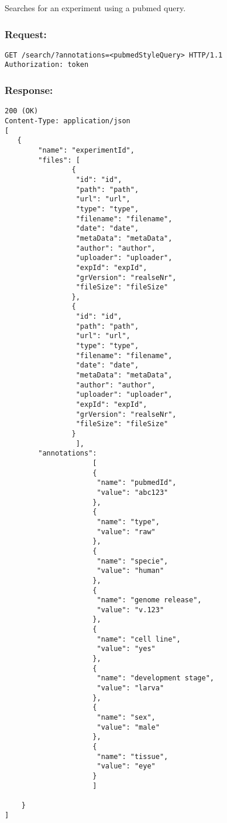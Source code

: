 Searches for an experiment using a pubmed query.

\subsubsection*{Request:}
\begin{verbatim}
GET /search/?annotations=<pubmedStyleQuery> HTTP/1.1
Authorization: token
\end{verbatim}

\subsubsection*{Response:}
\begin{verbatim}
200 (OK)
Content-Type: application/json
[
   {
        "name": "experimentId",
        "files": [
                { 
                 "id": "id",
                 "path": "path",
                 "url": "url",
                 "type": "type",
                 "filename": "filename",
                 "date": "date",
                 "metaData": "metaData",
                 "author": "author",
                 "uploader": "uploader",
                 "expId": "expId",
                 "grVersion": "realseNr",
                 "fileSize": "fileSize"
                },
                { 
                 "id": "id",
                 "path": "path",
                 "url": "url",
                 "type": "type",
                 "filename": "filename",
                 "date": "date",
                 "metaData": "metaData",
                 "author": "author",
                 "uploader": "uploader",
                 "expId": "expId",
                 "grVersion": "realseNr",
                 "fileSize": "fileSize"
                }
                 ],
        "annotations": 
                     [
                     {
                      "name": "pubmedId",
                      "value": "abc123"
                     }, 
                     {
                      "name": "type",
                      "value": "raw"
                     },
                     {
                      "name": "specie",
                      "value": "human"
                     },
                     {
                      "name": "genome release",
                      "value": "v.123"
                     },
                     {
                      "name": "cell line",
                      "value": "yes"
                     },
                     {
                      "name": "development stage",
                      "value": "larva"
                     },
                     {
                      "name": "sex",
                      "value": "male"
                     },
                     {
                      "name": "tissue",
                      "value": "eye"
                     }
                     ]

    }
]
\end{verbatim}

